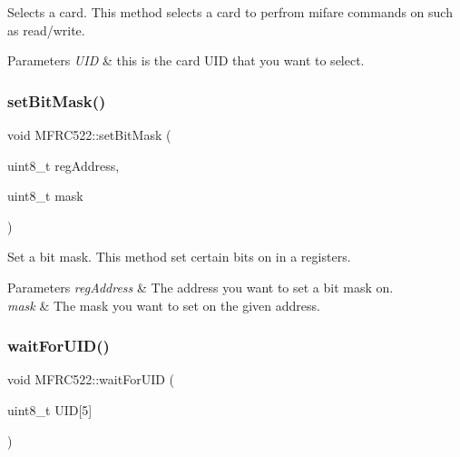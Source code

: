 Selects a card.  This method selects a card to perfrom mifare commands on such as read/write. 


\begin{DoxyParams}{Parameters}
{\em U\+ID} & this is the card U\+ID that you want to select. \\
\hline
\end{DoxyParams}
\mbox{\label{classMFRC522_a398266ee566ff9a51e6d814dd19cf3fd}} 
\subsubsection{\texorpdfstring{set\+Bit\+Mask()}{setBitMask()}}
{\footnotesize\ttfamily void M\+F\+R\+C522\+::set\+Bit\+Mask (\begin{DoxyParamCaption}\item[{uint8\+\_\+t}]{reg\+Address,  }\item[{uint8\+\_\+t}]{mask }\end{DoxyParamCaption})}



Set a bit mask.  This method set certain bits on in a registers. 


\begin{DoxyParams}{Parameters}
{\em reg\+Address} & The address you want to set a bit mask on. \\
\hline
{\em mask} & The mask you want to set on the given address. \\
\hline
\end{DoxyParams}
\mbox{\label{classMFRC522_a160ec18695ac578905ad9bcd033e1514}} 
\subsubsection{\texorpdfstring{wait\+For\+U\+I\+D()}{waitForUID()}}
{\footnotesize\ttfamily void M\+F\+R\+C522\+::wait\+For\+U\+ID (\begin{DoxyParamCaption}\item[{uint8\+\_\+t}]{U\+ID\mbox{[}5\mbox{]} }\end{DoxyParamCaption})}



